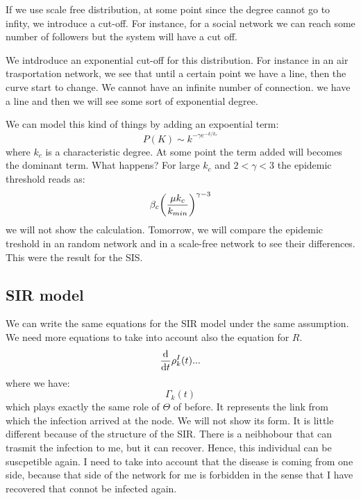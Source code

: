 \documentclass[../main/main.tex]{subfiles}
\begin{document}
If we use scale free distribution, at some point since the degree cannot go to infity, we introduce a cut-off. For instance, for a social network we can reach some number of followers but the system will have a cut off.

 We intdroduce an exponential cut-off for this distribution. For instance in an air trasportation network, we see that until a certain point we have a line, then the curve start to change. We cannot have an infinite number of connection. we have a line and then we will see some sort of exponential degree.

 We can model this kind of things by adding an expoential term:
 \begin{equation*}
   P(K) \sim k^{- \gamma   e^{-k/k_c} }
 \end{equation*}
where \( k_c \) is a characteristic degree. At some point the term added will becomes the dominant term. What happens? For large \( k_c \) and \( 2 < \gamma < 3  \) the epidemic threshold reads as:
\begin{equation*}
  \beta _c \qty(\frac{\mu k_c}{k_{min}})^{\gamma -3 }
\end{equation*}
we will not show the calculation. Tomorrow, we will compare the epidemic treshold in an random network and in a scale-free network to see their differences.
This were the result for the SIS.

\subsection{SIR model}
We can write the same equations for the SIR model under the same assumption. We need more equations to take into account also the equation for \( R \).
\begin{equation*}
  \dv{}{t} \rho _k^I(t) ...
\end{equation*}
where we have:
\begin{equation*}
  \Gamma _k (t)
\end{equation*}
which plays exactly the same role of \( \Theta  \) of before. It represents the link from which the infection arrived at the node. We will not show its form.  It is little different because of the structure of the SIR.
There is a neibhobour that can trasmit the infection to me, but it can recover. Hence, this individual can be suscpetible again.
I need to take into account that the disease is coming from one side, because that side of the network for me is forbidden in the sense that I have recovered that connot be infected again.
\end{document}
